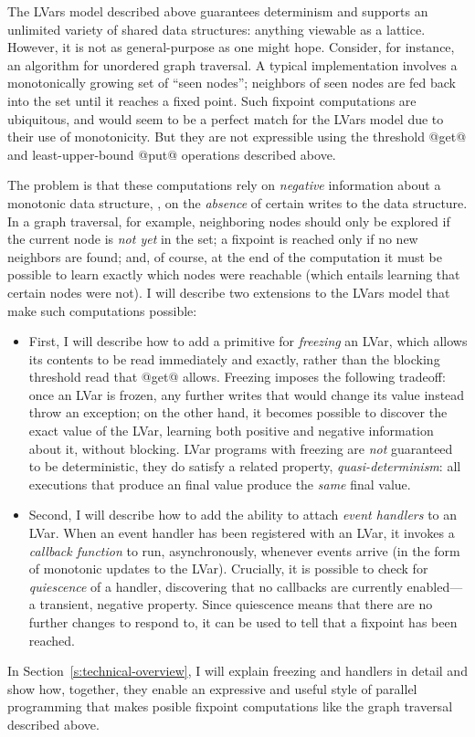 \documentclass{article}
\begin{document}
The LVars model described above guarantees determinism and supports an
unlimited variety of shared data structures: anything viewable as a
lattice.  However, it is not as general-purpose as one might hope.
Consider, for instance, an algorithm for unordered graph traversal.  A
typical implementation involves a monotonically growing set of ``seen
nodes''; neighbors of seen nodes are fed back into the set until it
reaches a fixed point.  Such fixpoint computations are ubiquitous, and
would seem to be a perfect match for the LVars model due to their use
of monotonicity.  But they are not expressible using the threshold
@get@ and least-upper-bound @put@ operations described above.

The problem is that these computations rely on \emph{negative}
information about a monotonic data structure, \ie, on the
\emph{absence} of certain writes to the data structure.  In a graph
traversal, for example, neighboring nodes should only be explored if
the current node is \emph{not yet} in the set; a fixpoint is reached
only if no new neighbors are found; and, of course, at the end of the
computation it must be possible to learn exactly which nodes were
reachable (which entails learning that certain nodes were not).  I
will describe two extensions to the LVars model that make such
computations possible:
\begin{itemize}
\item First, I will describe how to add a primitive for
  \emph{freezing} an LVar, which allows its contents to be read
  immediately and exactly, rather than the blocking threshold read
  that @get@ allows.  Freezing imposes the following tradeoff: once an
  LVar is frozen, any further writes that would change its value
  instead throw an exception; on the other hand, it becomes possible
  to discover the exact value of the LVar, learning both positive and
  negative information about it, without blocking.  LVar programs with
  freezing are \emph{not} guaranteed to be deterministic, they do
  satisfy a related property, \emph{quasi-determinism}: all executions
  that produce an final value produce the \emph{same} final value.
\item Second, I will describe how to add the ability to attach
  \emph{event handlers} to an LVar.  When an event handler has been
  registered with an LVar, it invokes a \emph{callback function} to
  run, asynchronously, whenever events arrive (in the form of
  monotonic updates to the LVar).  Crucially, it is possible to check
  for \emph{quiescence} of a handler, discovering that no callbacks
  are currently enabled---a transient, negative property.  Since
  quiescence means that there are no further changes to respond to, it
  can be used to tell that a fixpoint has been reached.
\end{itemize}
In Section~\ref{s:technical-overview}, I will explain freezing and
handlers in detail and show how, together, they enable an expressive
and useful style of parallel programming that makes posible fixpoint
computations like the graph traversal described above.
\end{document}

